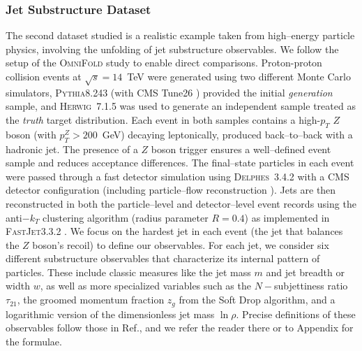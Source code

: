         \subsubsection{Jet Substructure Dataset}
            The second dataset studied is a realistic example taken from high--energy particle physics, involving the unfolding of jet substructure observables.
            We follow the setup of the \textsc{OmniFold} study  to enable direct comparisons.
            Proton-proton collision events at $\sqrt{s}=14$~TeV were generated using two different Monte Carlo simulators, \textsc{Pythia}8.243  (with CMS Tune26 ) provided the initial \emph{generation} sample, and \textsc{Herwig}~7.1.5  was used to generate an independent sample treated as the \emph{truth} target distribution.
            Each event in both samples contains a high-$p_T$ $Z$ boson (with $p_T^Z > 200$~GeV) decaying leptonically, produced back--to--back with a hadronic jet.
            The presence of a $Z$ boson trigger ensures a well--defined event sample and reduces acceptance differences.
            The final--state particles in each event were passed through a fast detector simulation using \textsc{Delphes}~3.4.2  with a CMS detector configuration (including particle--flow reconstruction ).
            Jets are then reconstructed in both the particle--level and detector--level event records using the anti$-k_T$ clustering algorithm  (radius parameter $R=0.4$) as implemented in \textsc{FastJet}3.3.2 .
            We focus on the hardest jet in each event (the jet that balances the $Z$ boson’s recoil) to define our observables.
            For each jet, we consider six different substructure observables that characterize its internal pattern of particles.
            These include classic measures like the jet mass $m$ and jet breadth or width $w$, as well as more specialized variables such as the \(N-\)subjettiness ratio $\tau_{21}$, the groomed momentum fraction $z_g$ from the Soft Drop algorithm, and a logarithmic version of the dimensionless jet mass $\ln\rho$.
            Precise definitions of these observables follow those in Ref., and we refer the reader there or to Appendix  for the formulae.
